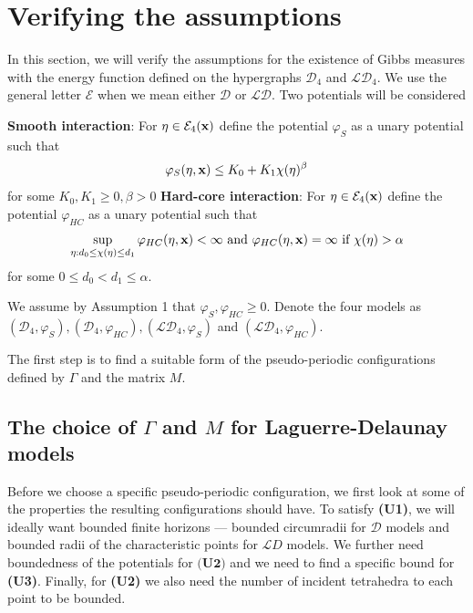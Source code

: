 \section{Verifying the assumptions}\label{sec:verifyassumptions}
In this section, we will verify the assumptions for the existence of Gibbs measures with the energy function defined on the hypergraphs $\mathcal D_4$ and $\mathcal {LD}_4$. We use the general letter $\mathcal E$ when we mean either $\mathcal D$ or $\mathcal {LD}$. Two potentials will be considered

\noindent \textbf{Smooth interaction}:  For $\eta\in\mathcal E_4({\mathbf{x}})$ define the potential $\varphi_S$ as a unary potential such that
$$\varphi_S(\eta,{\mathbf{x}}) \leq K_0 + K_1 \chi(\eta)^{\beta}$$
for some $K_0,K_1 \geq 0, \beta >0$\newline
\textbf{Hard-core interaction}: For $\eta\in\mathcal E_4({\mathbf{x}})$ define the potential $\varphi_{HC}$ as a unary potential such that
$$\sup_{\eta: d_0 \leq \chi(\eta) \leq d_1} \varphi_{HC}(\eta,{\mathbf{x}})  < \infty \text{ and } \varphi_{HC}(\eta,{\mathbf{x}})=\infty \text{ if } \chi(\eta)>\alpha$$ 
for some $0\leq d_0 < d_1 \leq \alpha$. 

\noindent We assume by Assumption 1 that $\varphi_S,\varphi_{HC}\geq 0$. Denote the four models as $(\mathcal D_4,\varphi_{S}),(\mathcal D_4,\varphi_{HC}),(\mathcal {LD}_4,\varphi_{S})$ and $(\mathcal {LD}_4, \varphi_{HC})$. \newline

The first step is to find a suitable form of the pseudo-periodic configurations defined by $\Gamma$ and the matrix $M$. 

\subsection{The choice of $\Gamma$ and $M$ for Laguerre-Delaunay models}\label{sec:MGamma}
Before we choose a specific pseudo-periodic configuration, we first look at some of the properties the resulting configurations should have. To satisfy \textbf{(U1)}, we will ideally want bounded finite horizons --- bounded circumradii for $\mathcal D$ models and bounded radii of the characteristic points for $\mathcal LD$ models. We further need boundedness of the potentials for $\textbf{(U2)}$ and we need to find a specific bound for \textbf{(U3)}. Finally, for \textbf{(U2)} we also need the number of incident tetrahedra to each point to be bounded.

